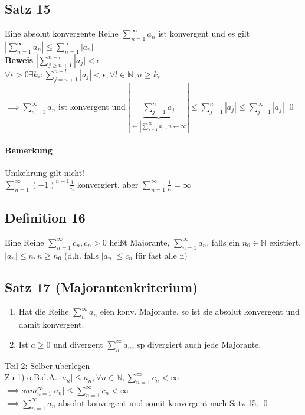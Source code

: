 \documentclass[fleqn]{scrbook}
\renewenvironment{proof}{{\bfseries Beweis }}{\qed}
\begin{document}
\subsection{Satz 15}
Eine absolut konvergente Reihe $\sum_{n=1}^\infty a_n$ ist konvergent und es gilt $|\sum_{n=1}^\infty a_n | \leq \sum_{n=1}^\infty |a_n|$\\
\begin{proof}
$|\sum_{j\geq n+1}^{n+l} |a_j| < \epsilon$\\
$\forall \epsilon > 0 \exists k_\epsilon : \sum_{j=n+1}^{n+l} |a_j| < \epsilon , \forall l \in \mathbb{N}, n \geq k_\epsilon$\\
$\implies \sum_{n=1}^\infty a_n$ ist konvergent und $|\underbrace{\sum_{j=1}^n a_j}_{\leftarrow |\sum_{j=1}^\infty a_j|, n\leftarrow \infty}| \leq \sum_{j=1}^n |a_j| \leq \sum_{j=1}^\infty |a_j|$
\end{proof}

\paragraph{Bemerkung} Umkehrung gilt nicht!\\
$\sum_{n=1}^\infty (-1)^{n-1} \frac{1}{n}$ konvergiert, aber $\sum_{n=1}^\infty \frac{1}{n} = \infty$

\subsection{Definition 16}
Eine Reihe $\sum_{n=1}^\infty c_n, c_n > 0$ heißt Majorante, $\sum_{n=1}^\infty a_n$, falls ein $n_0 \in \mathbb{N}$ existiert.\\
$|a_n|\leq n, n \geq n_0$ (d.h. falls $|a_n| \leq c_n$ für fast alle n)

\subsection{Satz 17 (Majorantenkriterium)}
\begin{enumerate}[1)]
\item Hat die Reihe $\sum_{n}^\infty a_n$ eien konv. Majorante, so ist sie absolut konvergent und damit konvergent.
\item Ist $a \geq 0$ und divergent $\sum_n^\infty a_n$, sp divergiert auch jede Majorante.
\end{enumerate}

\begin{proof}
Teil 2: Selber überlegen\\
Zu 1) o.B.d.A. $|a_n| \leq a_n, \forall n \in\mathbb{N}, \sum_{n=1}^\infty c_n < \infty$\\
$\implies sum_{n=1}^\infty |a_n| \leq \sum_{n=1}^\infty c_n < \infty$\\
$\implies \sum_{n=1}^\infty a_n$ absolut konvergent und somit konvergent nach Satz 15.
\end{proof}
\end{document}
